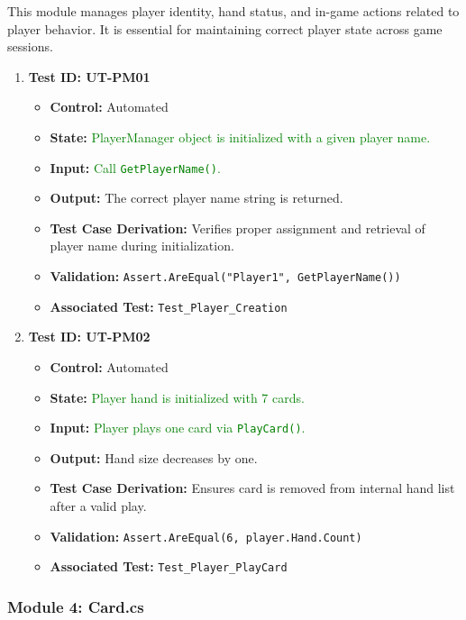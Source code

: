 \documentclass[12pt]{article}
\newcommand{\added}[1]{\textcolor{green}{#1}}
\begin{document}
This module manages player identity, hand status, and in-game actions related to player behavior. It is essential for maintaining correct player state across game sessions.

\begin{enumerate}
    \item \textbf{Test ID: UT-PM01}
    \begin{itemize}
        \item \textbf{Control:} Automated
        \item \textbf{State:} \added{PlayerManager object is initialized with a given player name.}
        \item \textbf{Input:} \added{Call \texttt{GetPlayerName()}.}
        \item \textbf{Output:} The correct player name string is returned.
        \item \textbf{Test Case Derivation:} Verifies proper assignment and retrieval of player name during initialization.
        \item \textbf{Validation:} \texttt{Assert.AreEqual("Player1", GetPlayerName())}
        \item \textbf{Associated Test:} \texttt{Test\_Player\_Creation}
    \end{itemize}

    \item \textbf{Test ID: UT-PM02}
    \begin{itemize}
        \item \textbf{Control:} Automated
        \item \textbf{State:} \added{Player hand is initialized with 7 cards.}
        \item \textbf{Input:} \added{Player plays one card via \texttt{PlayCard()}.}
        \item \textbf{Output:} Hand size decreases by one.
        \item \textbf{Test Case Derivation:} Ensures card is removed from internal hand list after a valid play.
        \item \textbf{Validation:} \texttt{Assert.AreEqual(6, player.Hand.Count)}
        \item \textbf{Associated Test:} \texttt{Test\_Player\_PlayCard}
    \end{itemize}
\end{enumerate}

\subsubsection{Module 4: Card.cs}
\end{document}
